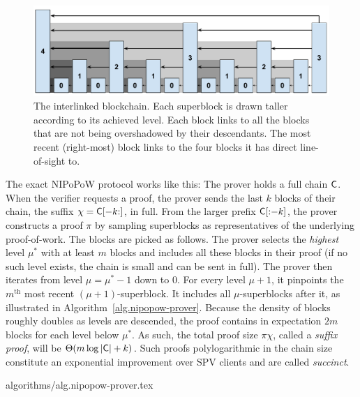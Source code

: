 \begin{figure}[ht]
    \centering
    \includegraphics[width=0.8\columnwidth,keepaspectratio]{figures/level-shadows.pdf}
    \caption{The interlinked blockchain. Each superblock is drawn taller
    according to its achieved level. Each block links to all the blocks that are
    not being overshadowed by their descendants. The most recent (right-most)
    block links to the four blocks it has direct line-of-sight to.}
    \label{fig.hierarchy}
\end{figure}

The exact NIPoPoW protocol works like this: The prover holds a full chain
$\mathsf{C}$. When the verifier requests a proof, the prover sends the last $k$
blocks of their chain, the suffix $\chi = \mathsf{C}[-k{:}]$, in full. From the
larger prefix $\mathsf{C}[{:}{-k}]$, the prover constructs a proof $\pi$ by sampling
superblocks as representatives of the underlying proof-of-work.
The blocks are picked as follows. The prover selects the \emph{highest}
level $\mu^*$ with at least $m$ blocks and includes all these blocks
in their proof (if no such level exists, the chain is small and can be sent in
full). The prover then iterates from level $\mu = \mu^* - 1$ down to $0$. For
every level $\mu+1$, it pinpoints the $m^\text{th}$ most recent $(\mu+1)$-superblock.
It includes all $\mu$-superblocks after it, as
illustrated in
Algorithm~\ref{alg.nipopow-prover}. Because the density of blocks roughly doubles as
levels are descended, the proof contains in expectation $2m$ blocks for each
level below $\mu^*$. As such, the total proof size $\pi \chi$, called a \emph{suffix proof},
will be
$\Theta(m\log|\mathsf{C}| + k)$. Such proofs polylogarithmic in the chain
size constitute an exponential improvement over SPV clients and are
called \emph{succinct}.

{algorithms/alg.nipopow-prover.tex}

